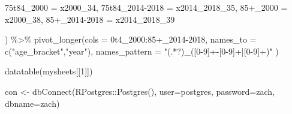 \documentclass[
]{article}
\newenvironment{Shaded}{\begin{snugshade}}{\end{snugshade}}
\newcommand{\AttributeTok}[1]{\textcolor[rgb]{0.77,0.63,0.00}{#1}}
\newcommand{\DecValTok}[1]{\textcolor[rgb]{0.00,0.00,0.81}{#1}}
\newcommand{\FunctionTok}[1]{\textcolor[rgb]{0.00,0.00,0.00}{#1}}
\newcommand{\NormalTok}[1]{#1}
\newcommand{\OtherTok}[1]{\textcolor[rgb]{0.56,0.35,0.01}{#1}}
\newcommand{\SpecialCharTok}[1]{\textcolor[rgb]{0.00,0.00,0.00}{#1}}
\newcommand{\StringTok}[1]{\textcolor[rgb]{0.31,0.60,0.02}{#1}}
\begin{document}
\begin{Shaded}
\begin{Highlighting}[]
        \StringTok{\textasciigrave{}}\AttributeTok{75t84\_2000}\StringTok{\textasciigrave{}} \OtherTok{=}\NormalTok{ x2000\_34, }\StringTok{\textasciigrave{}}\AttributeTok{75t84\_2014{-}2018}\StringTok{\textasciigrave{}} \OtherTok{=}\NormalTok{ x2014\_2018\_35, }\StringTok{\textasciigrave{}}\AttributeTok{85+\_2000}\StringTok{\textasciigrave{}} \OtherTok{=}\NormalTok{ x2000\_38, }\StringTok{\textasciigrave{}}\AttributeTok{85+\_2014{-}2018}\StringTok{\textasciigrave{}} \OtherTok{=}\NormalTok{ x2014\_2018\_39}
        
\NormalTok{        ) }\SpecialCharTok{\%\textgreater{}\%}
  \FunctionTok{pivot\_longer}\NormalTok{(}\AttributeTok{cols =} \StringTok{\textasciigrave{}}\AttributeTok{0t4\_2000}\StringTok{\textasciigrave{}}\SpecialCharTok{:}\StringTok{\textasciigrave{}}\AttributeTok{85+\_2014{-}2018}\StringTok{\textasciigrave{}}\NormalTok{,}
             \AttributeTok{names\_to =} \FunctionTok{c}\NormalTok{(}\StringTok{"age\_bracket"}\NormalTok{,}\StringTok{"year"}\NormalTok{),}
             \AttributeTok{names\_pattern =} \StringTok{"(.*?)\_([0{-}9]+{-}[0{-}9]+|[0{-}9]+)"}
\NormalTok{  )}
\end{Highlighting}
\end{Shaded}

\begin{Shaded}
\begin{Highlighting}[]
\FunctionTok{datatable}\NormalTok{(mysheets[[}\DecValTok{1}\NormalTok{]])}
\end{Highlighting}
\end{Shaded}

\begin{Shaded}
\begin{Highlighting}[]
\NormalTok{con }\OtherTok{\textless{}{-}} \FunctionTok{dbConnect}\NormalTok{(RPostgres}\SpecialCharTok{::}\FunctionTok{Postgres}\NormalTok{(), }\AttributeTok{user=}\StringTok{\textquotesingle{}postgres\textquotesingle{}}\NormalTok{, }\AttributeTok{password=}\StringTok{\textquotesingle{}zach\textquotesingle{}}\NormalTok{, }\AttributeTok{dbname=}\StringTok{\textquotesingle{}zach\textquotesingle{}}\NormalTok{)}
\end{Highlighting}
\end{Shaded}
\end{document}
